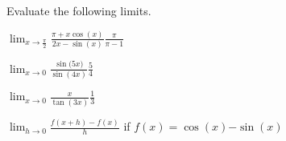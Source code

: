 \noindent Evaluate the following limits.

\problemans%
{$\displaystyle \lim_{x\rightarrow \frac{\pi}{2}} \frac{\pi + x\cos{(x)}}{2x - \sin{(x)}}$}{$\frac{\pi}{\pi-1}$}

\problemans%
{$\displaystyle \lim_{x\rightarrow 0}  \frac{\sin{(5x})}{\sin{(4x)}}$}{$\frac{5}{4}$}

\problemans%
{$\displaystyle \lim_{x\rightarrow 0}  \frac{x}{\tan{(3x)}}$}{$\frac{1}{3}$}

\problemans%
{$\displaystyle  \lim_{h\rightarrow 0} \frac{f(x+h) - f(x)}{h}$ if $\displaystyle f(x) = \cos{(x)}$}{$-\sin{(x)}$}

